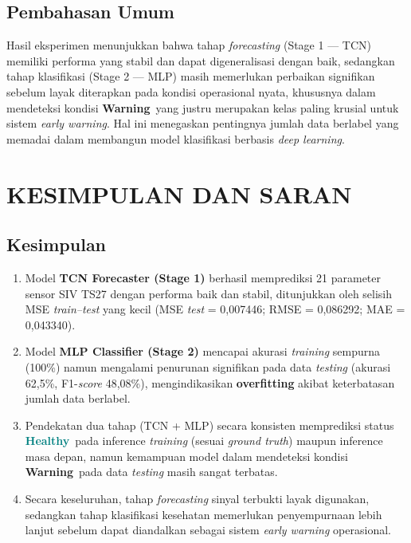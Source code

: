 \documentclass[12pt,a4paper]{report}
\newcommand{\healthy}{\textcolor{teal}{\textbf{Healthy}}}
\newcommand{\warning}{\textcolor{orange!80!black}{\textbf{Warning}}}
\begin{document}
\section{Pembahasan Umum}
Hasil eksperimen menunjukkan bahwa tahap \textit{forecasting} (Stage 1 — TCN) memiliki performa yang stabil dan dapat digeneralisasi dengan baik, sedangkan tahap klasifikasi (Stage 2 — MLP) masih memerlukan perbaikan signifikan sebelum layak diterapkan pada kondisi operasional nyata, khususnya dalam mendeteksi kondisi \warning\ yang justru merupakan kelas paling krusial untuk sistem \textit{early warning}. Hal ini menegaskan pentingnya jumlah data berlabel yang memadai dalam membangun model klasifikasi berbasis \textit{deep learning}.

\newpage
\chapter{KESIMPULAN DAN SARAN}

\section{Kesimpulan}
\begin{enumerate}
    \item Model \textbf{TCN Forecaster (Stage 1)} berhasil memprediksi 21 parameter sensor SIV TS27 dengan performa baik dan stabil, ditunjukkan oleh selisih MSE \textit{train--test} yang kecil (MSE \textit{test} = 0,007446; RMSE = 0,086292; MAE = 0,043340).
    \item Model \textbf{MLP Classifier (Stage 2)} mencapai akurasi \textit{training} sempurna (100\%) namun mengalami penurunan signifikan pada data \textit{testing} (akurasi 62,5\%, F1-\textit{score} 48,08\%), mengindikasikan \textbf{overfitting} akibat keterbatasan jumlah data berlabel.
    \item Pendekatan dua tahap (TCN + MLP) secara konsisten memprediksi status \healthy\ pada inference \textit{training} (sesuai \textit{ground truth}) maupun inference masa depan, namun kemampuan model dalam mendeteksi kondisi \warning\ pada data \textit{testing} masih sangat terbatas.
    \item Secara keseluruhan, tahap \textit{forecasting} sinyal terbukti layak digunakan, sedangkan tahap klasifikasi kesehatan memerlukan penyempurnaan lebih lanjut sebelum dapat diandalkan sebagai sistem \textit{early warning} operasional.
\end{enumerate}
\end{document}
